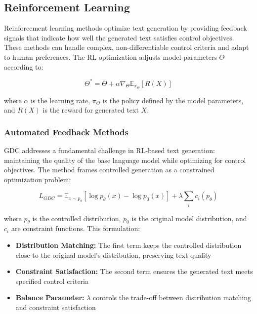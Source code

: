 \subsection{Reinforcement Learning}
\label{c2:s:rl}

Reinforcement learning methods optimize text generation by providing feedback signals that indicate how well the generated text satisfies control objectives. These methods can handle complex, non-differentiable control criteria and adapt to human preferences. The RL optimization adjusts model parameters $\Theta$ according to:

\begin{equation}
   \Theta^* = \Theta + \alpha\nabla_\Theta \mathbb{E}_{\pi_\Theta}[R(X)]
\end{equation}

where $\alpha$ is the learning rate, $\pi_\Theta$ is the policy defined by the model parameters, and $R(X)$ is the reward for generated text $X$. 

\subsubsection{Automated Feedback Methods}

GDC addresses a fundamental challenge in RL-based text generation: maintaining the quality of the base language model while optimizing for control objectives. The method frames controlled generation as a constrained optimization problem:

\begin{equation}
   L_{GDC} = \mathbb{E}_{x\sim p_\theta}[\log p_\theta(x) - \log p_0(x)] + \lambda\sum_i c_i(p_\theta)
\end{equation}

where $p_\theta$ is the controlled distribution, $p_0$ is the original model distribution, and $c_i$ are constraint functions. This formulation:

\begin{itemize}
   \item \textbf{Distribution Matching:} The first term keeps the controlled distribution close to the original model's distribution, preserving text quality
   
   \item \textbf{Constraint Satisfaction:} The second term ensures the generated text meets specified control criteria
   
   \item \textbf{Balance Parameter:} $\lambda$ controls the trade-off between distribution matching and constraint satisfaction
\end{itemize}

